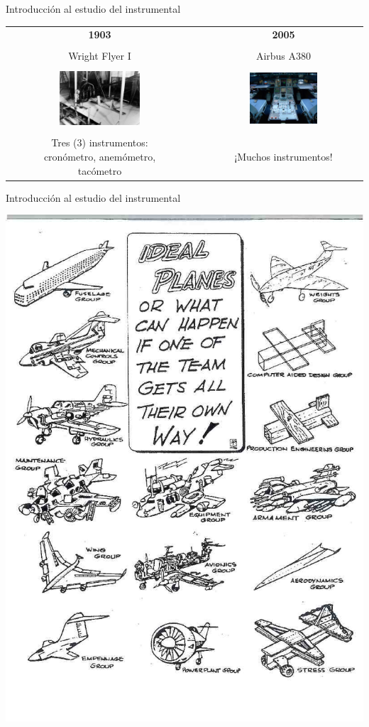 \documentclass[10pt]{beamer}
\begin{document}
\begin{frame}{Introducci\'on al estudio del instrumental}
  
  \begin{tabular}{ccc}
    {\bf \large 1903} & & {\bf \large 2005} \\ & & \\
	{Wright Flyer I} & & {Airbus A380} \\ & & \\
    \includegraphics[width=0.45\textwidth]{imagenes/1.1.introduccion/wright_brothers_instruments.jpg}
	& \hspace{5mm}
	&\includegraphics[width=0.45\textwidth]{imagenes/1.1.introduccion/A380_Cockpit_2.jpg} \\ & & \\
\parbox{0.4\textwidth}{\small
	Tres (3) instrumentos: \\
	\mbox{cron\'ometro}, anem\'ometro,\\ tac\'ometro}
	& & ¡Muchos instrumentos! \\
  \end{tabular}

\end{frame}

\begin{frame}{Introducci\'on al estudio del instrumental}

 \includegraphics[width=0.5\linewidth]{imagenes/1.1.introduccion/IntelligentDesignMain}

\end{frame}
\end{document}
